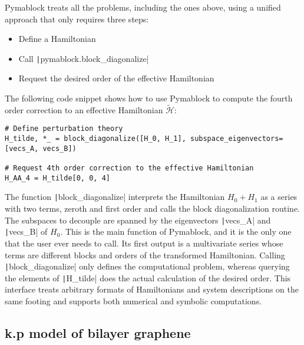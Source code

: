Pymablock treats all the problems, including the ones above, using a unified approach that only requires three steps:
%
\begin{itemize}
\item Define a Hamiltonian
\item Call \texttt|pymablock.block_diagonalize|
\item Request the desired order of the effective Hamiltonian
\end{itemize}
%
The following code snippet shows how to use Pymablock to compute the fourth order correction to an effective Hamiltonian $\tilde{\mathcal{H}}$:
%
\begin{verbatim}
# Define perturbation theory
H_tilde, *_ = block_diagonalize([H_0, H_1], subspace_eigenvectors=[vecs_A, vecs_B])

# Request 4th order correction to the effective Hamiltonian
H_AA_4 = H_tilde[0, 0, 4]
\end{verbatim}
%
The function \texttt|block_diagonalize| interprets the Hamiltonian $H_0 + H_1$ as a series with two terms, zeroth and first order and calls the block diagonalization routine.
The subspaces to decouple are spanned by the eigenvectors \texttt|vecs_A| and \texttt|vecs_B| of $H_0$.
This is the main function of Pymablock, and it is the only one that the user ever needs to call.
Its first output is a multivariate series whose terms are different blocks and orders of the transformed Hamiltonian.
Calling \texttt|block_diagonalize| only defines the computational problem, whereas querying the elements of \texttt|H_tilde| does the actual calculation of the desired order.
This interface treats arbitrary formats of Hamiltonians and system descriptions on the same footing and supports both numerical and symbolic computations.

\subsection{k.p model of bilayer graphene}
\label{sec:bilayer_graphene}

